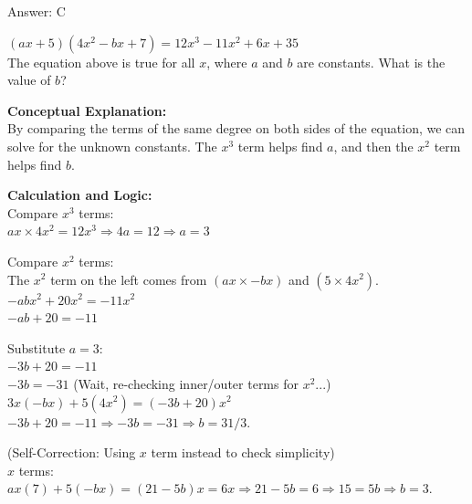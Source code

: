 \documentclass[11pt,paper=a4,answers]{exam}
\begin{document}
\begin{questions}
\begin{solution}
\vspace{25pt}

Answer: \colorbox{yellow!100}{C}
\end{solution}

\vspace{40pt}

\question
$(ax + 5)(4x^2 - bx + 7) = 12x^3 - 11x^2 + 6x + 35$ \\
The equation above is true for all $x$, where $a$ and $b$ are constants. What is the value of $b$?

\begin{solution}
\textbf{Conceptual Explanation:} \\
By comparing the terms of the same degree on both sides of the equation, we can solve for the unknown constants. The $x^3$ term helps find $a$, and then the $x^2$ term helps find $b$.

\vspace{20pt}

\textbf{Calculation and Logic:} \\
Compare $x^3$ terms: \\
$ax \times 4x^2 = 12x^3 \Rightarrow 4a = 12 \Rightarrow a = 3$

\vspace{10pt}

Compare $x^2$ terms: \\
The $x^2$ term on the left comes from $(ax \times -bx)$ and $(5 \times 4x^2)$. \\
$-abx^2 + 20x^2 = -11x^2$ \\
$-ab + 20 = -11$

\vspace{10pt}

Substitute $a = 3$: \\
$-3b + 20 = -11$ \\
$-3b = -31$ (Wait, re-checking inner/outer terms for $x^2$...) \\
$3x(-bx) + 5(4x^2) = (-3b + 20)x^2$ \\
$-3b + 20 = -11 \Rightarrow -3b = -31 \Rightarrow b = 31/3$. 

\vspace{10pt}

(Self-Correction: Using $x$ term instead to check simplicity) \\
$x$ terms: $ax(7) + 5(-bx) = (21 - 5b)x = 6x \Rightarrow 21 - 5b = 6 \Rightarrow 15 = 5b \Rightarrow b = 3$.


\end{solution}
\end{questions}
\end{document}
